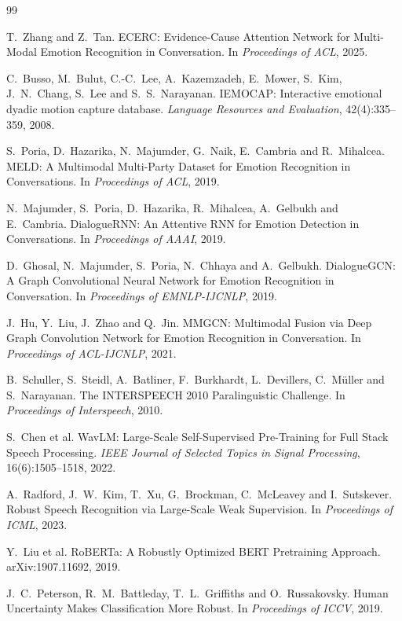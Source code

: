 \documentclass[11pt,a4paper]{article}
\begin{document}
\begin{thebibliography}{99}

 T.~Zhang and Z.~Tan. ECERC: Evidence-Cause Attention Network for Multi-Modal Emotion Recognition in Conversation. In \emph{Proceedings of ACL}, 2025.

 C.~Busso, M.~Bulut, C.-C.~Lee, A.~Kazemzadeh, E.~Mower, S.~Kim, J.~N.~Chang, S.~Lee and S.~S.~Narayanan. IEMOCAP: Interactive emotional dyadic motion capture database. \emph{Language Resources and Evaluation}, 42(4):335--359, 2008.

 S.~Poria, D.~Hazarika, N.~Majumder, G.~Naik, E.~Cambria and R.~Mihalcea. MELD: A Multimodal Multi-Party Dataset for Emotion Recognition in Conversations. In \emph{Proceedings of ACL}, 2019.

 N.~Majumder, S.~Poria, D.~Hazarika, R.~Mihalcea, A.~Gelbukh and E.~Cambria. DialogueRNN: An Attentive RNN for Emotion Detection in Conversations. In \emph{Proceedings of AAAI}, 2019.

 D.~Ghosal, N.~Majumder, S.~Poria, N.~Chhaya and A.~Gelbukh. DialogueGCN: A Graph Convolutional Neural Network for Emotion Recognition in Conversation. In \emph{Proceedings of EMNLP-IJCNLP}, 2019.

 J.~Hu, Y.~Liu, J.~Zhao and Q.~Jin. MMGCN: Multimodal Fusion via Deep Graph Convolution Network for Emotion Recognition in Conversation. In \emph{Proceedings of ACL-IJCNLP}, 2021.

 B.~Schuller, S.~Steidl, A.~Batliner, F.~Burkhardt, L.~Devillers, C.~M\"uller and S.~Narayanan. The INTERSPEECH 2010 Paralinguistic Challenge. In \emph{Proceedings of Interspeech}, 2010.

 S.~Chen et al. WavLM: Large-Scale Self-Supervised Pre-Training for Full Stack Speech Processing. \emph{IEEE Journal of Selected Topics in Signal Processing}, 16(6):1505--1518, 2022.

 A.~Radford, J.~W.~Kim, T.~Xu, G.~Brockman, C.~McLeavey and I.~Sutskever. Robust Speech Recognition via Large-Scale Weak Supervision. In \emph{Proceedings of ICML}, 2023.

 Y.~Liu et al. RoBERTa: A Robustly Optimized BERT Pretraining Approach. arXiv:1907.11692, 2019.

 J.~C.~Peterson, R.~M.~Battleday, T.~L.~Griffiths and O.~Russakovsky. Human Uncertainty Makes Classification More Robust. In \emph{Proceedings of ICCV}, 2019.


\end{thebibliography}
\end{document}
